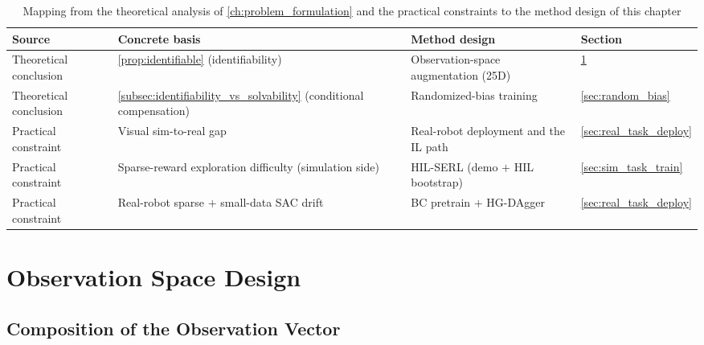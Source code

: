 \begin{table}[htbp]
  \centering
  \caption{Mapping from the theoretical analysis of \cref{ch:problem_formulation} and the practical constraints to the method design of this chapter}
  \label{tab:method_mapping}
  \footnotesize
  \begin{adjustbox}{max width=\textwidth}
  \begin{tabular}{@{}llll@{}}
    \toprule
    Source & Concrete basis & Method design & Section \\
    \midrule
    Theoretical conclusion & \cref{prop:identifiable} (identifiability) & Observation-space augmentation (25D) & \cref{sec:obs_design} \\
    Theoretical conclusion & \cref{subsec:identifiability_vs_solvability} (conditional compensation) & Randomized-bias training & \cref{sec:random_bias} \\
    Practical constraint & Visual sim-to-real gap & Real-robot deployment and the IL path & \cref{sec:real_task_deploy} \\
    Practical constraint & Sparse-reward exploration difficulty (simulation side) & HIL-SERL (demo $+$ HIL bootstrap) & \cref{sec:sim_task_train} \\
    Practical constraint & Real-robot sparse $+$ small-data SAC drift & BC pretrain $+$ HG-DAgger & \cref{sec:real_task_deploy} \\
    \bottomrule
  \end{tabular}
  \end{adjustbox}
\end{table}

\section{Observation Space Design}\label{sec:obs_design}

\subsection{Composition of the Observation Vector}\label{subsec:obs_vector}

